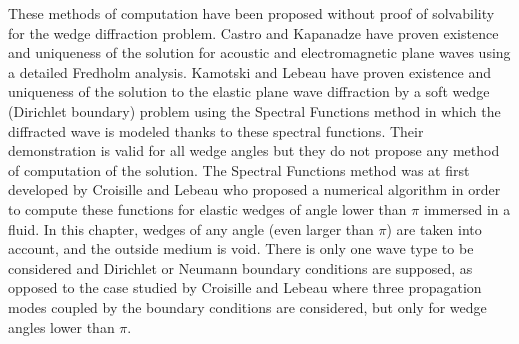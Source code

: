 
These methods of computation have been proposed without proof of solvability for the wedge diffraction problem. Castro and Kapanadze \cite{Castro} have proven existence and uniqueness of the solution for acoustic and electromagnetic plane waves using a detailed Fredholm analysis. Kamotski and Lebeau \cite{KamotskiLebeau} have proven existence and uniqueness of the solution to the elastic plane wave diffraction  by a soft wedge (Dirichlet boundary) problem using the Spectral Functions method in which the diffracted wave is modeled thanks to these spectral functions. Their demonstration is valid for all wedge angles but they do not propose any method of computation of the solution. The Spectral Functions method was at first developed by Croisille and Lebeau \cite{CroisilleLebeau} who proposed a numerical algorithm in order to compute these functions for elastic wedges of angle lower than $\pi$ immersed in a fluid. In this chapter, wedges of any angle (even larger than $\pi$) are taken into account, and the outside medium is void. There is only one wave type to be considered and Dirichlet or Neumann boundary conditions are supposed, as opposed to the case studied by Croisille and Lebeau \cite{CroisilleLebeau} where three propagation modes coupled by the boundary conditions are considered, but only for wedge angles lower than $\pi$.

